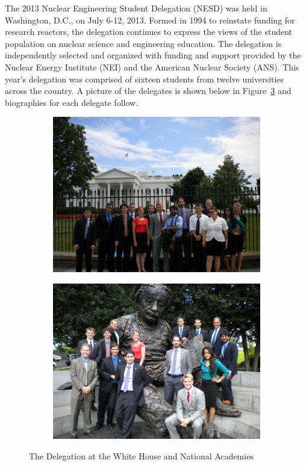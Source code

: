 The 2013 Nuclear Engineering Student Delegation (NESD) was held in Washington,
D.C., on July 6-12, 2013. Formed in 1994 to reinstate funding for research
reactors, the delegation continues to express the views of the student
population on nuclear science and engineering education. The delegation is
independently selected and organized with funding and support provided by the
Nuclear Energy Institute (NEI) and the American Nuclear Society (ANS). This
year's delegation was comprised of sixteen students from twelve universities
across the country. A picture of the delegates is shown below in
Figure~\ref{fig:delegates} and biographies for each delegate follow.

\begin{figure}[h]
\centering
\begin{subfigure}{.5 \textwidth}
  \centering
  \includegraphics[width=.95 \linewidth]{NESD_WH.jpg}
  \label{fig:whitehouse}
\end{subfigure}%
\begin{subfigure}{.5\textwidth}
  \centering
  \includegraphics[width=.95 \linewidth]{NESD_Ein.jpg}
  \label{fig:einstein}
\end{subfigure}
\caption{The Delegation at the White House and National Academies}
\label{fig:delegates}
\end{figure}

